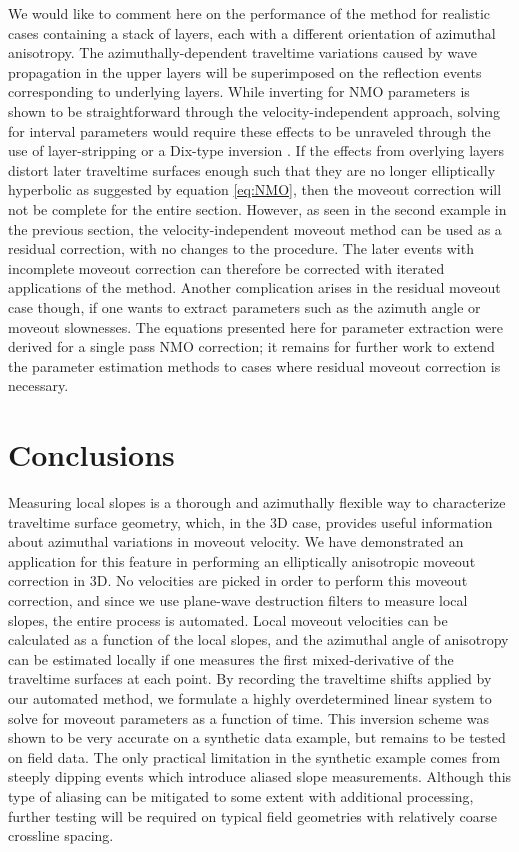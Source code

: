 We would like to comment here on the performance of the method for realistic cases containing a stack of layers, each with a different orientation of azimuthal anisotropy.  The azimuthally-dependent traveltime variations caused by wave propagation in the upper layers will be superimposed on the reflection events corresponding to underlying layers.  While inverting for NMO parameters is shown to be straightforward through the velocity-independent approach, solving for interval parameters would require these effects to be unraveled through the use of layer-stripping \cite[]{hake86} or a Dix-type inversion \cite[]{GPR47-02-01170148, GEO67-03-09390951}.  If the effects from overlying layers distort later traveltime surfaces enough such that they are no longer elliptically hyperbolic as suggested by equation \ref{eq:NMO}, then the moveout correction will not be complete for the entire section.  However, as seen in the second example in the previous section, the velocity-independent moveout method can be used as a residual correction, with no changes to the procedure.  The later events with incomplete moveout correction can therefore be corrected with iterated applications of the method.  Another complication arises in the residual moveout case though, if one wants to extract parameters such as the azimuth angle or moveout slownesses.  The equations presented here for parameter extraction were derived for a single pass NMO correction; it remains for further work to extend the parameter estimation methods to cases where residual moveout correction is necessary.

\section{Conclusions}

Measuring local slopes is a thorough and azimuthally flexible way to characterize traveltime surface geometry, which, in the 3D case, provides useful information about azimuthal variations in moveout velocity.  We have demonstrated an application for this feature in performing an elliptically anisotropic moveout correction in 3D.  No velocities are picked in order to perform this moveout correction, and since we use plane-wave destruction filters to measure local slopes, the entire process is automated.  Local moveout velocities can be calculated as a function of the local slopes, and the azimuthal angle of anisotropy can be estimated locally if one measures the first mixed-derivative of the traveltime surfaces at each point.  By recording the traveltime shifts applied by our automated method, we formulate a highly overdetermined linear system to solve for moveout parameters as a function of time.  This inversion scheme was shown to be very accurate on a synthetic data example, but remains to be tested on field data.  The only practical limitation in the synthetic example comes from steeply dipping events which introduce aliased slope measurements.  Although this type of aliasing can be mitigated to some extent with additional processing, further testing will be required on typical field geometries with relatively coarse crossline spacing.

